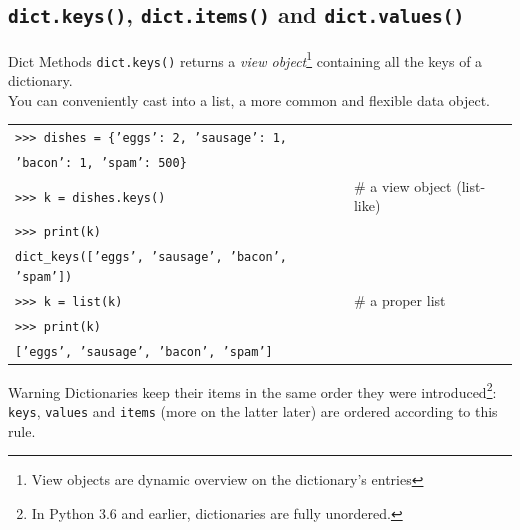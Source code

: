 \documentclass[t,handout,9pt]{beamer}
\begin{document}
\subsection{\texttt{dict.keys()}, \texttt{dict.items()} and \texttt{dict.values()}}
\begin{frame}{Dict Methods}
\vfill
\texttt{dict.keys()} returns a \textit{view object}\footnote{View objects are dynamic overview on the dictionary's entries} containing all the keys of a dictionary.\\
You can conveniently cast into a list, a more common and flexible data object.
\begin{table}[]
\begin{flushleft}
\begin{tabular}{ll}
\texttt{>{}>{}> dishes = \{'eggs': 2, 'sausage': 1,} &   \\
\texttt{\qquad 'bacon': 1, 'spam': 500\}} &   \\
\texttt{>{}>{}> k = dishes.keys()} &   \# a view object (list-like)\\
\texttt{>{}>{}> print(k)} &   \\
\texttt{dict\_keys(['eggs', 'sausage', 'bacon', 'spam'])} &   \\
\texttt{>{}>{}> k = list(k)} &   \# a proper list \\
\texttt{>{}>{}> print(k)} &   \\
\texttt{['eggs', 'sausage', 'bacon', 'spam']} &   \\
\end{tabular}
\end{flushleft}
\end{table}
\begin{block}{Warning}
Dictionaries keep their items in the same order they were introduced\footnote{In Python 3.6 and earlier, dictionaries are fully unordered.}: \texttt{keys}, \texttt{values} and \texttt{items} (more on the latter later) are ordered according to this rule.
\end{block}
\vfill
\end{frame}
%
\end{document}
